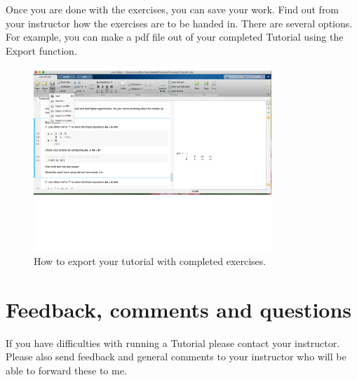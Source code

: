 \documentclass[11pt]{article}
\begin{document}
\vspace{2mm}
\noindent
Once you are done with the exercises,
you can save your work.
Find out from your instructor how the exercises are to be handed in.
There are several options. 
For example, you can make a pdf file out of your completed Tutorial using the Export function.
\begin{figure}[h!]
\centering
\includegraphics[width=0.8\textwidth]{Export.pdf}
\caption{
How to export your tutorial with completed exercises.
}
\end{figure}

\section{Feedback, comments and questions}
If you have difficulties with running a Tutorial please contact your instructor.
Please also send feedback and general comments to your instructor
who will be able to forward these to me.
\end{document}
